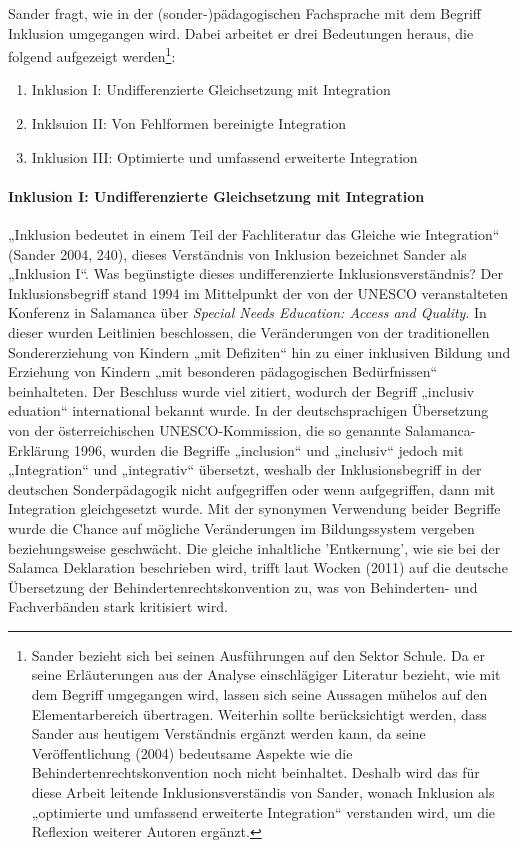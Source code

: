 Sander fragt, wie in der (sonder-)pädagogischen Fachsprache mit dem Begriff Inklusion umgegangen wird. Dabei arbeitet er drei Bedeutungen heraus, die folgend aufgezeigt werden\footnote{Sander bezieht sich bei seinen Ausführungen auf den Sektor Schule. Da er seine Erläuterungen aus der Analyse einschlägiger Literatur bezieht, wie mit dem Begriff umgegangen wird, lassen sich seine Aussagen mühelos auf den Elementarbereich übertragen.
Weiterhin sollte berücksichtigt werden, dass Sander aus heutigem Verständnis ergänzt werden kann, da seine Veröffentlichung (2004) bedeutsame Aspekte wie die Behindertenrechtskonvention noch nicht beinhaltet. Deshalb wird das für diese Arbeit leitende Inklusionsverständis von Sander, wonach Inklusion als „optimierte und umfassend erweiterte Integration“ verstanden wird, um die Reflexion weiterer Autoren ergänzt.}: 
\begin{enumerate}
\item Inklusion I: Undifferenzierte Gleichsetzung mit Integration
\item Inklsuion II: Von Fehlformen bereinigte Integration
\item Inklusion III: Optimierte und umfassend erweiterte Integration
\end{enumerate}  
  
\paragraph{Inklusion I: Undifferenzierte Gleichsetzung mit Integration}
„Inklusion bedeutet in einem Teil der Fachliteratur das Gleiche wie Integration“ (Sander 2004, 240), dieses Verständnis von Inklusion bezeichnet Sander als „Inklusion I“. 
Was begünstigte dieses undifferenzierte Inklusionsverständnis? 
Der Inklusionsbegriff stand 1994 im Mittelpunkt der von der UNESCO veranstalteten Konferenz in Salamanca über \emph{Special Needs Education: Access and Quality}. In dieser wurden Leitlinien beschlossen, die Veränderungen von der traditionellen Sondererziehung von Kindern „mit Defiziten“ hin zu einer inklusiven Bildung und Erziehung von Kindern „mit besonderen pädagogischen Bedürfnissen“ beinhalteten. Der Beschluss wurde viel zitiert, wodurch der Begriff „inclusiv eduation“ international bekannt wurde. 
In der deutschsprachigen Übersetzung von der österreichischen UNESCO-Kommission, die so genannte Salamanca-Erklärung 1996, wurden die Begriffe „inclusion“ und „inclusiv“ jedoch mit „Integration“ und „integrativ“ übersetzt, weshalb der Inklusionsbegriff in der deutschen Sonderpädagogik nicht aufgegriffen oder wenn aufgegriffen, dann mit Integration gleichgesetzt wurde. Mit der synonymen Verwendung beider Begriffe wurde die Chance auf mögliche Veränderungen im Bildungssystem vergeben beziehungsweise geschwächt. Die gleiche inhaltliche 'Entkernung', wie sie bei der Salamca Deklaration beschrieben wird, trifft laut Wocken (2011) auf die deutsche Übersetzung der Behindertenrechtskonvention zu, was von Behinderten- und Fachverbänden stark kritisiert wird.
  
